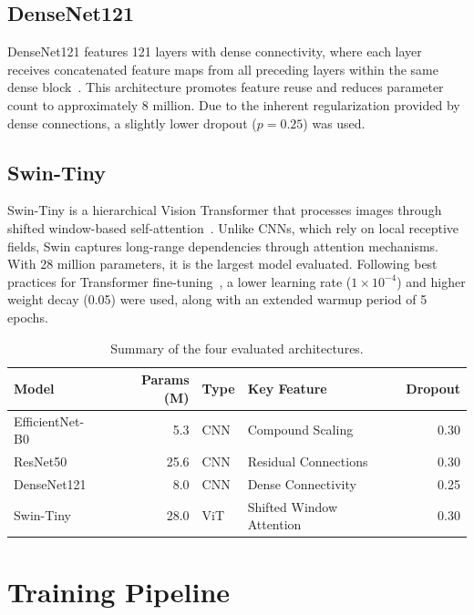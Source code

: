 \subsection{DenseNet121}

DenseNet121 features 121 layers with dense connectivity, where each layer receives concatenated feature maps from all preceding layers within the same dense block~\cite{huang2017densely}. This architecture promotes feature reuse and reduces parameter count to approximately 8 million. Due to the inherent regularization provided by dense connections, a slightly lower dropout ($p=0.25$) was used.

\subsection{Swin-Tiny}

Swin-Tiny is a hierarchical Vision Transformer that processes images through shifted window-based self-attention~\cite{liu2021swin}. Unlike CNNs, which rely on local receptive fields, Swin captures long-range dependencies through attention mechanisms. With 28 million parameters, it is the largest model evaluated. Following best practices for Transformer fine-tuning~\cite{touvron2021deit}, a lower learning rate ($1 \times 10^{-4}$) and higher weight decay (0.05) were used, along with an extended warmup period of 5 epochs.

\begin{table}[H]
\centering
\caption{Summary of the four evaluated architectures.}
\label{tab:architectures}
\begin{tabular}{lrllr}
\toprule
\textbf{Model} & \textbf{Params (M)} & \textbf{Type} & \textbf{Key Feature} & \textbf{Dropout} \\
\midrule
EfficientNet-B0 & 5.3  & CNN & Compound Scaling  & 0.30 \\
ResNet50        & 25.6 & CNN & Residual Connections & 0.30 \\
DenseNet121     & 8.0  & CNN & Dense Connectivity  & 0.25 \\
Swin-Tiny       & 28.0 & ViT & Shifted Window Attention & 0.30 \\
\bottomrule
\end{tabular}
\end{table}

\section{Training Pipeline}

